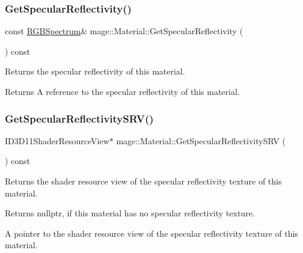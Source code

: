 \subsubsection{\texorpdfstring{Get\+Specular\+Reflectivity()}{GetSpecularReflectivity()}\hspace{0.1cm}{\footnotesize\ttfamily [2/2]}}
{\footnotesize\ttfamily const \hyperlink{structmage_1_1_r_g_b_spectrum}{R\+G\+B\+Spectrum}\& mage\+::\+Material\+::\+Get\+Specular\+Reflectivity (\begin{DoxyParamCaption}{ }\end{DoxyParamCaption}) const\hspace{0.3cm}{\ttfamily [noexcept]}}

Returns the specular reflectivity of this material.

\begin{DoxyReturn}{Returns}
A reference to the specular reflectivity of this material. 
\end{DoxyReturn}
\hypertarget{structmage_1_1_material_a04fad2f985ed5078a8217ebcfd51c3f0}{}\label{structmage_1_1_material_a04fad2f985ed5078a8217ebcfd51c3f0} 
\subsubsection{\texorpdfstring{Get\+Specular\+Reflectivity\+S\+R\+V()}{GetSpecularReflectivitySRV()}}
{\footnotesize\ttfamily I\+D3\+D11\+Shader\+Resource\+View$\ast$ mage\+::\+Material\+::\+Get\+Specular\+Reflectivity\+S\+RV (\begin{DoxyParamCaption}{ }\end{DoxyParamCaption}) const\hspace{0.3cm}{\ttfamily [noexcept]}}

Returns the shader resource view of the specular reflectivity texture of this material.

\begin{DoxyReturn}{Returns}
{\ttfamily nullptr}, if this material has no specular reflectivity texture. 

A pointer to the shader resource view of the specular reflectivity texture of this material. 
\end{DoxyReturn}
\hypertarget{structmage_1_1_material_a7c3ea6461982e7dc9a60a391d601f172}{}\label{structmage_1_1_material_a7c3ea6461982e7dc9a60a391d601f172} 
